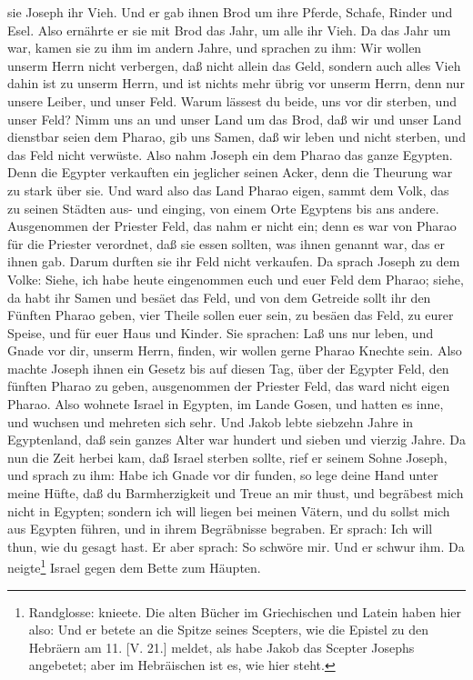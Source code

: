 \begin{schriftzitat}
sie Joseph ihr Vieh. Und er gab ihnen Brod um ihre Pferde, Schafe, Rinder und Esel. Also ernährte er sie mit Brod das Jahr, um alle ihr Vieh. Da das Jahr um war, kamen sie zu ihm im andern Jahre, und sprachen zu ihm: Wir wollen unserm Herrn nicht verbergen, daß nicht allein das Geld, sondern auch alles Vieh dahin ist zu unserm Herrn, und ist nichts mehr übrig vor unserm Herrn, denn nur unsere Leiber, und unser Feld. Warum lässest du beide, uns vor dir sterben, und unser Feld? Nimm uns an und unser Land um das Brod, daß wir und unser Land dienstbar seien dem Pharao, gib uns Samen, daß wir leben und nicht sterben, und das Feld nicht verwüste. Also nahm Joseph ein dem Pharao das ganze Egypten. Denn die Egypter verkauften ein jeglicher seinen Acker, denn die Theurung war zu stark über sie. Und ward also das Land Pharao eigen, sammt dem Volk, das zu seinen Städten aus- und einging, von einem Orte Egyptens bis ans andere. Ausgenommen der Priester Feld, das nahm er nicht ein; denn es war von Pharao für die Priester verordnet, daß sie essen sollten, was ihnen genannt war, das er ihnen gab. Darum durften sie ihr Feld nicht verkaufen. Da sprach Joseph zu dem Volke: Siehe, ich habe heute eingenommen euch und euer Feld dem Pharao; siehe, da habt ihr Samen und besäet das Feld, und von dem Getreide sollt ihr den Fünften Pharao geben, vier Theile sollen euer sein, zu besäen das Feld, zu eurer Speise, und für euer Haus und Kinder. Sie sprachen: Laß uns nur leben, und Gnade vor dir, unserm Herrn, finden, wir wollen gerne Pharao Knechte sein. Also machte Joseph ihnen ein Gesetz bis auf diesen Tag, über der Egypter Feld, den fünften Pharao zu geben, ausgenommen der Priester Feld, das ward nicht eigen Pharao. Also wohnete Israel in Egypten, im Lande Gosen, und hatten es inne, und wuchsen und mehreten sich sehr. Und Jakob lebte siebzehn Jahre in Egyptenland, daß sein ganzes Alter war hundert und sieben und vierzig Jahre. Da nun die Zeit herbei kam, daß Israel sterben sollte, rief er seinem Sohne Joseph, und sprach zu ihm: Habe ich Gnade vor dir funden, so lege deine Hand unter meine Hüfte, daß du Barmherzigkeit und Treue an mir thust, und begräbest mich nicht in Egypten; sondern ich will liegen bei meinen Vätern, und du sollst mich aus Egypten führen, und in ihrem Begräbnisse begraben. Er sprach: Ich will thun, wie du gesagt hast. Er aber sprach: So schwöre mir. Und er schwur ihm. Da neigte\footnote{Randglosse: knieete. Die alten Bücher im Griechischen und Latein haben hier also: Und er betete an die Spitze seines Scepters, wie die Epistel zu den Hebräern am 11. [V. 21.] meldet, als habe Jakob das Scepter Josephs angebetet; aber im Hebräischen ist es, wie hier steht.} Israel gegen dem Bette zum Häupten.
\end{schriftzitat}

